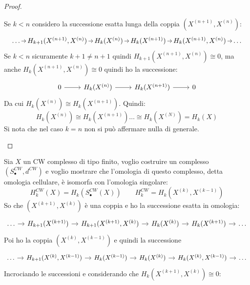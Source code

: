 \begin{proof}
\begin{enumerate}
    Se $ k < n $ considero la successione esatta lunga della coppia $ (X^{(n+1)}, X^{(n)}) $:
    \[
      \begin{tikzcd}[nodes={column sep=7pt, inner sep = 2 pt}]
        \dots \rar & H_{k+1}(X^{(n+1)}, X^{(n)}) \rar & H_k(X^{(n)}) \rar & H_k(X^{(n+1)}) \rar & H_{k}(X^{(n+1)}, X^{(n)}) \rar & \dots
      \end{tikzcd}
    \]
    Se $ k < n $ sicuramente $ k + 1 \not = n + 1 $ quindi $ H_{k+1}(X^{(n+1)}, X^{(n)}) \cong 0 $,
    ma anche $ H_k(X^{(n+1)}, X^{(n)}) \cong 0 $
    quindi ho la successione:
    \[
      \begin{tikzcd}
       0\rar & H_k(X^{(n)}) \rar & H_k(X^{(n+1)}) \rar & 0
      \end{tikzcd}
    \]
    Da cui $ H_k(X^{(n)}) \cong H_k(X^{(n+1)}) $.
    Quindi:
    \[
      H_k(X^{(n)}) \cong H_k(X^{(n+1)}) \dots \cong H_k(X^{(N)}) = H_k(X)
    \]
    Si nota che nel caso $ k = n $ non si può affermare nulla di generale.
  \end{enumerate}
  \vspace*{-15pt}
\end{proof}
\eproof
Sia $ X $ un CW complesso di tipo finito, voglio costruire un complesso $ (S_\bullet^{CW}, d^{CW}) $ e
voglio mostrare che l'omologia di questo complesso, detta omologia cellulare, è isomorfa con
l'omologia singolare:
\[
  H_k^{CW}(X) = H_k(S^{CW}_\bullet(X)) \qquad H_k^{CW} = H_k(X^{(k)}, X^{(k-1)})
\]
So che $ (X^{(k+1)}, X^{(k)}) $ è una coppia
e ho la successione esatta in omologia:
\[
  \begin{tikzcd}[nodes={column sep=10pt}]
    \dots \rar  & H_{k+1}(X^{(k+1)}) \rar & H_{k+1}(X^{(k+1)}, X^{(k)}) \rar & H_k(X^{(k)})   \rar & H_k(X^{(k+1)}) \rar & \dots
  \end{tikzcd}
\]
Poi ho la coppia $ (X^{(k)}, X^{(k-1)}) $ e quindi la successione
\[
  \begin{tikzcd}[nodes={column sep=10pt}]
    \dots \rar & H_{k+1}(X^{(k)}, X^{(k-1)}) \rar & H_k(X^{(k-1)}) \rar & H_k(X^{(k)}) \rar & H_{k}(X^{(k)}, X^{(k-1)}) \rar & \dots
  \end{tikzcd}
\]
Incrociando le successioni e considerando che $ H_k(X^{(k+1)}, X^{(k)}) \cong 0$:
